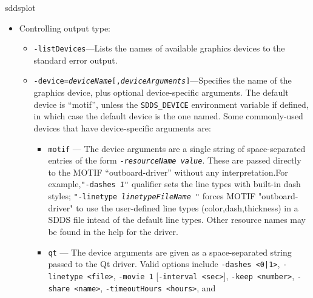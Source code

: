 \begin{sddsprog}{sddsplot}
\begin{itemize}
\begin{itemize}
  \item {\tt -namescan=\{all | first\}} --- Specifies whether \verb|sddsplot| should scan all input files when searching
        for matches to wildcard datanames, or only the first.  The default is to scan all files, which may be slow
        for many files with large numbers of columns or parameters.

  \item {\tt -define=\{column | parameter\},{\em equation}[,{\em definition-entries}]} --- Defines a column or parameter
    for plotting, in terms of columns and parameters in the input file. This option must be given inside a plot request
    and the request must have only one file.
    
  \end{itemize}
   
\item Controlling output type:
  \begin{itemize}
  \item {\tt -listDevices}---Lists the names of available graphics devices to the standard error output.
  \item {\tt -device={\em deviceName}[,{\em deviceArguments}]}---Specifies the name of the graphics
        device, plus optional device-specific arguments.  The default device is ``motif'', unless the
        {\tt SDDS\_DEVICE} environment variable if defined, in which case the default device is the one
        named.
        Some commonly-used devices that have device-specific arguments are:
        \begin{itemize} 
        \item {\tt motif} --- The device arguments are a single string of space-separated entries of the
        form {\tt -{\em resourceName} {\em value}}.  These are passed directly to the MOTIF ``outboard-driver''
        without any interpretation.For example,{\tt "-dashes {\em 1}"} qualifier sets the line types with
        built-in dash styles; {\tt "-linetype {\em linetypeFileName }"} forces MOTIF "outboard-driver" to use
        the user-defined line types (color,dash,thickness)  in a SDDS file intead of the default line types.
        Other resource names may be found in the help for the driver.
        \item {\tt qt} --- The device arguments are given as a space-separated string passed to the Qt
        driver.  Valid options include {\tt -dashes <0|1>}, {\tt -linetype <file>}, {\tt -movie 1}
        [{\tt -interval <sec>}], {\tt -keep <number>}, {\tt -share <name>}, {\tt -timeoutHours <hours>}, and

\end{itemize}
\end{itemize}
\end{itemize}
\end{sddsprog}

